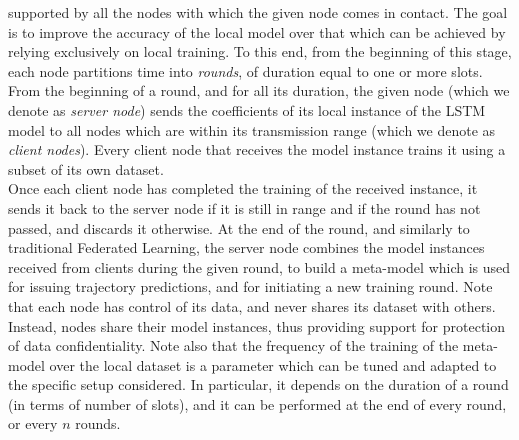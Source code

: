 \documentclass[conference]{IEEEtran}
\begin{document}
supported by all the nodes with which the given node comes in contact. The goal is to improve the accuracy of the local model over that which can be achieved by relying exclusively on local training. To this end, from the beginning of this stage, each node partitions time into \textit{rounds}, of duration equal to one or more slots.\\
From the beginning of a round, and for all its duration, the given node (which we denote as \textit{server node}) sends the coefficients of its local instance of the LSTM model to all nodes which are within its transmission range (which we denote as \textit{client nodes}). Every client node that receives the model instance trains it using a subset of its own dataset.\\ 
  Once each client node has completed the training of the received instance, it sends it back to the server node if it is still in range and if the round has not passed, and discards it otherwise. At the end of the round, and similarly to traditional Federated Learning, the server node combines the model instances received from clients during the given round, to build a meta-model which is used for issuing trajectory predictions, and for initiating a new training round. %
 Note that each node has control of its data, and never shares its dataset with others. Instead, nodes share their model instances, thus providing support for protection of data confidentiality. Note also that the frequency of the training of the meta-model over the local dataset is a parameter which can be tuned and adapted to the specific setup considered. In particular, it depends on the duration of a round (in terms of number of slots), and it can be performed at the end of every round, or every $n$ rounds.\\
\end{document}
